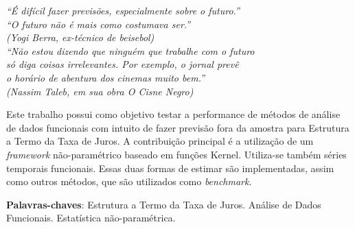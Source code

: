 \documentclass[
	12pt,				%
	openright,			%
	oneside,			%
	a4paper,			%
	english,			%
	brazil				%
	]{dissertacao-ufrgs-abntex2}
\begin{document}

\begin{agradecimentos}


\end{agradecimentos}

\begin{epigrafe}
    \vspace*{\fill}
	\begin{flushright}
		\textit{
		``É difícil fazer previsões, especialmente sobre o futuro.''\\
		``O futuro não é mais como costumava ser.'' \\
		(Yogi Berra, ex-técnico de beisebol)\\ [1cm]
		``Não estou dizendo que ninguém que trabalhe com o futuro\\
		só diga coisas irrelevantes. Por exemplo, o jornal prevê \\
		o horário de abentura dos cinemas muito bem.'' \\		
		(Nassim Taleb, em sua obra \emph{O Cisne Negro})
		}
	\end{flushright}
\end{epigrafe}


\setlength{\absparsep}{18pt} %
\begin{resumo}

Este trabalho possui como objetivo testar a performance de métodos de análise de dados funcionais com intuito de fazer previsão fora da amostra para Estrutura a Termo da Taxa de Juros. A contribuição principal é a utilização de um \emph{framework} não-paramétrico baseado em funções Kernel. Utiliza-se também séries temporais funcionais. Essas duas formas de estimar são implementadas, assim como outros métodos, que são utilizados como \emph{benchmark}. 


 \textbf{Palavras-chaves}: Estrutura a Termo da Taxa de Juros. Análise de Dados Funcionais. Estatística não-paramétrica.
\end{resumo}
\end{document}
